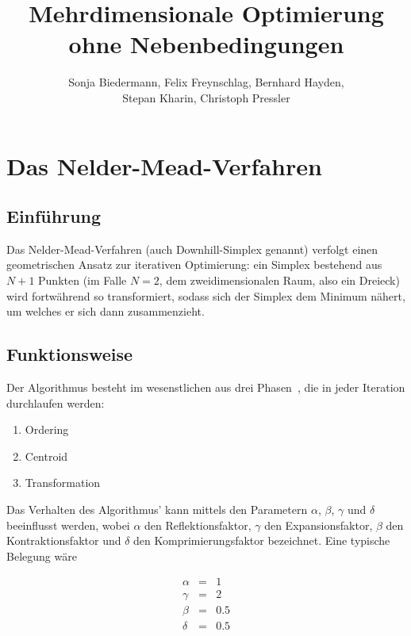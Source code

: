 \documentclass[naustrian]{article}
\begin{document}
\title{Mehrdimensionale Optimierung ohne Nebenbedingungen}

\author{Sonja Biedermann, Felix Freynschlag, Bernhard Hayden,\\
Stepan Kharin, Christoph Pressler}

\maketitle
\tableofcontents

\section{Das Nelder-Mead-Verfahren}

\subsection{Einführung}

Das Nelder-Mead-Verfahren (auch Downhill-Simplex genannt) verfolgt
einen geometrischen Ansatz zur iterativen Optimierung: ein Simplex
bestehend aus $N+1$ Punkten (im Falle $N=2$, dem zweidimensionalen
Raum, also ein Dreieck) wird fortwährend so transformiert, sodass
sich der Simplex dem Minimum nähert, um welches er sich dann zusammenzieht.~\cite{nelder-mead-enwiki}

\subsection{Funktionsweise}\label{funktionsweise}

Der Algorithmus besteht im wesenstlichen aus drei
Phasen~\cite{nelder-mead-scholarpedia}, die in jeder Iteration durchlaufen
werden:
\begin{enumerate}
    \item Ordering
    \item Centroid
    \item Transformation
\end{enumerate}

Das Verhalten des Algorithmus' kann mittels den Parametern $\alpha$, $\beta$, $\gamma$
und $\delta$ beeinflusst werden, wobei $\alpha$ den Reflektionsfaktor, $\gamma$ den
Expansionsfaktor, $\beta$ den Kontraktionsfaktor und $\delta$ den Komprimierungsfaktor
bezeichnet. Eine typische Belegung wäre

\begin{eqnarray*}
    \alpha & = & 1\\
    \gamma & = & 2\\
    \beta & = & 0.5\\
    \delta & = & 0.5
\end{eqnarray*}
\end{document}
